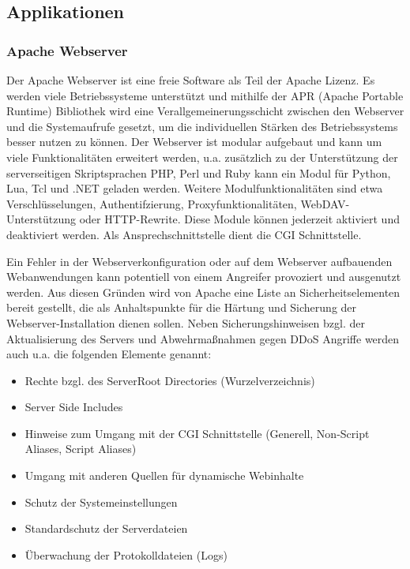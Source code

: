\subsection{Applikationen}


\subsubsection{Apache Webserver}
Der Apache Webserver ist eine freie Software als Teil der Apache Lizenz. Es werden viele Betriebssysteme unterstützt und mithilfe der APR (Apache Portable Runtime) Bibliothek wird eine Verallgemeinerungsschicht zwischen den Webserver und die Systemaufrufe gesetzt, um die individuellen Stärken des Betriebssystems besser nutzen zu können.
Der Webserver ist modular aufgebaut und kann um viele Funktionalitäten erweitert werden, u.a. zusätzlich zu der Unterstützung der serverseitigen Skriptsprachen PHP, Perl und Ruby kann ein Modul für Python, Lua, Tcl und .NET geladen werden. Weitere Modulfunktionalitäten sind etwa Verschlüsselungen, Authentifzierung, Proxyfunktionalitäten, WebDAV-Unterstützung oder HTTP-Rewrite. Diese Module können jederzeit aktiviert und deaktiviert werden. Als Ansprechschnittstelle dient die CGI Schnittstelle.

Ein Fehler in der Webserverkonfiguration oder auf dem Webserver aufbauenden Webanwendungen kann potentiell von einem Angreifer provoziert und ausgenutzt werden. Aus diesen Gründen wird von Apache eine Liste an Sicherheitselementen bereit gestellt, die als Anhaltspunkte für die Härtung und Sicherung der Webserver-Installation dienen sollen. Neben Sicherungshinweisen bzgl. der Aktualisierung des Servers und Abwehrmaßnahmen gegen DDoS Angriffe werden auch u.a. die folgenden Elemente genannt:
\begin{itemize}
\item Rechte bzgl. des ServerRoot Directories (Wurzelverzeichnis)
\item Server Side Includes
\item Hinweise zum Umgang mit der CGI Schnittstelle (Generell, Non-Script Aliases, Script Aliases)
\item Umgang mit anderen Quellen für dynamische Webinhalte
\item Schutz der Systemeinstellungen
\item Standardschutz der Serverdateien 
\item Überwachung der Protokolldateien (Logs)
\end{itemize}

